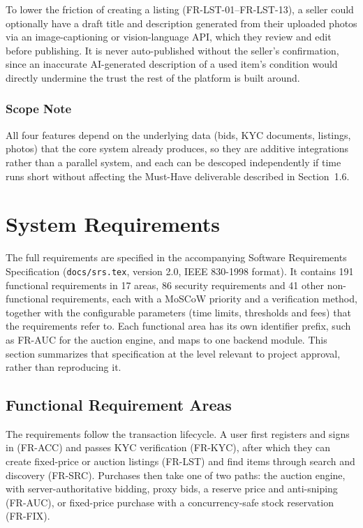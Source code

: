 \documentclass[11pt,a4paper]{article}
\begin{document}
To lower the friction of creating a listing (FR-LST-01--FR-LST-13), a seller could optionally have a draft title
and description generated from their uploaded photos via an image-captioning or vision-language API,
which they review and edit before publishing. It is never auto-published without the seller's
confirmation, since an inaccurate AI-generated description of a used item's condition would directly
undermine the trust the rest of the platform is built around.

\subsubsection*{Scope Note}

All four features depend on the underlying data (bids, KYC documents, listings, photos) that the core
system already produces, so they are additive integrations rather than a parallel system, and each can be
descoped independently if time runs short without affecting the Must-Have deliverable described in
Section~1.6.

\section{System Requirements}

The full requirements are specified in the accompanying Software Requirements Specification
(\texttt{docs/srs.tex}, version 2.0, IEEE 830-1998 format). It contains 191 functional requirements in
17 areas, 86 security requirements and 41 other non-functional requirements, each with a MoSCoW priority
and a verification method, together with the configurable parameters (time limits, thresholds and fees)
that the requirements refer to. Each functional area has its own identifier prefix, such as FR-AUC for the
auction engine, and maps to one backend module. This section summarizes that specification at the level
relevant to project approval, rather than reproducing it.

\subsection{Functional Requirement Areas}

The requirements follow the transaction lifecycle. A user first registers and signs in (FR-ACC) and
passes KYC verification (FR-KYC), after which they can create fixed-price or auction listings (FR-LST)
and find items through search and discovery (FR-SRC). Purchases then take one of two paths: the auction
engine, with server-authoritative bidding, proxy bids, a reserve price and anti-sniping (FR-AUC), or
fixed-price purchase with a concurrency-safe stock reservation (FR-FIX).
\end{document}
